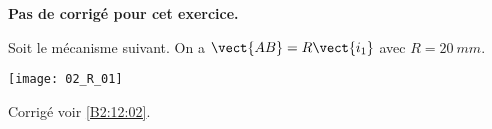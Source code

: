 \normaltrue
\correctionfalse


\setcounter{numques}{0}
\ifcorrection
\else
\textbf{Pas de corrigé pour cet exercice.}
\fi

\ifprof
\else
Soit le mécanisme suivant. On a $\vect{AB}=R\vect{i_1}$ avec $R=\SI{20}{mm}$. 
\begin{center}
\texttt{[image: 02\_R\_01]}
\end{center}
\fi
{}
\ifprof

\else
\fi

\ifprof
\else
\fi



\ifprof
\else
\begin{flushright}
\footnotesize{Corrigé  voir \ref{B2:12:02}.}
\end{flushright}%
\fi